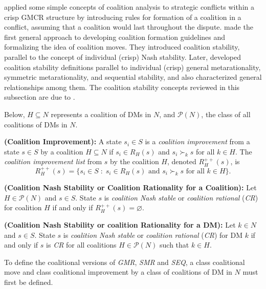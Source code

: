 \citet{Kuhn-et-al1983} applied some simple concepts of coalition analysis to strategic conflicts within a crisp GMCR structure by introducing rules for formation of a coalition in a conflict, assuming that a coalition would last throughout the dispute. \citet{Kilgour-et-al2001} made the first general approach to developing coalition formation guidelines and formalizing the idea of coalition moves. They introduced coalition stability, parallel to the concept of individual (crisp) Nash stability. Later, \citet{Inohara&Hipel2008a, Inohara&Hipel2008b} developed coalition stability definitions parallel to individual (crisp) general metarationality, symmetric metarationality, and sequential stability, and also characterized general relationships among them. The coalition stability concepts reviewed in this subsection are due to \citep{Kilgour-et-al2001, Inohara&Hipel2008a, Inohara&Hipel2008b}.

Below, $H \subseteq N$ represents a coalition of DMs in $N$, and $\mathcal{P}(N)$, the class of all coalitions of DMs in $N$.

\begin{definition}\label{def-ci}
\rm {\bf (Coalition Improvement):} A state $s_i \in S$ is a \emph{coalition improvement} from a state $s \in S$ by a coalition $H \subseteq N$ if $s_i \in R_H(s)$ and $s_i \succ_k s$ for all $k \in H$. The \emph{coalition improvement list} from $s$ by the coalition $H$, denoted $R_H^{++}(s)$, is
$$R_H^{++}(s)=\{s_i \in S \; : \; s_i \in R_H(s) \text{ and } s_i \succ_k s \text{ for all } k \in H\}.$$
\end{definition}

\begin{definition}
\rm {\bf (Coalition Nash Stability or Coalition Rationality for a Coalition):} Let $H \in \mathcal{P}(N)$ and $s \in S$. State $s$ is \emph{coalition Nash stable} or \emph{coalition rational} (\emph{CR}) for coalition $H$ if and only if $R_H^{++}(s)=\varnothing$.
\end{definition}

\begin{definition}
\rm {\bf (Coalition Nash Stability or coalition Rationality for a DM):} Let $k \in N$ and $s \in S$. State $s$ is \emph{coalition Nash stable} or \emph{coalition rational} (\emph{CR}) for DM $k$ if and only if $s$ is \emph{CR} for all coalitions $H \in \mathcal{P}(N)$ such that $k \in H$.
\end{definition}

\noindent To define the coalitional versions of \emph{GMR}, \emph{SMR} and \emph{SEQ}, a class coalitional move and class coalitional improvement by a class of coalitions of DM in $N$ must first be defined.

